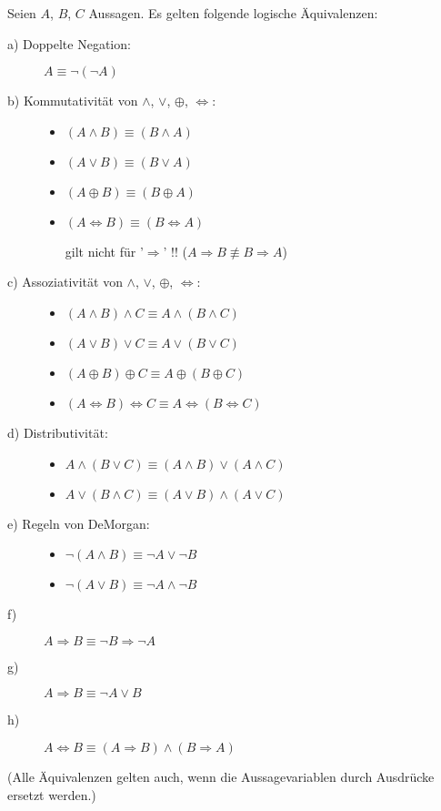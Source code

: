 \documentclass[a4paper, 12pt, twoside] {article}
\newcommand{\attention}{{\fontencoding{U}\fontfamily{futs}\selectfont\char 66\relax}\space}
\begin{document}
Seien $A$, $B$, $C$ Aussagen.
Es gelten folgende logische Äquivalenzen:
\begin{description}
  \item[a) Doppelte Negation:]
  $A \equiv \neg(\neg A)$

  \item[b) Kommutativität von $\wedge$, $\lor$, $\oplus$, $\Leftrightarrow$:] \hfill
  \begin{itemize}
    \item $(A \wedge B) \equiv (B \wedge A)$
    \item $(A \lor B) \equiv (B \lor A)$
    \item $(A \oplus B) \equiv (B \oplus A)$
    \item $(A \Leftrightarrow B) \equiv (B \Leftrightarrow A)$

    \attention gilt nicht für '$\Rightarrow$' !! ($A \Rightarrow B \not\equiv B \Rightarrow A$)
  \end{itemize}  

  \item[c) Assoziativität von $\wedge$, $\lor$, $\oplus$, $\Leftrightarrow$:] \hfill
  \begin{itemize}
      \item $(A \wedge B) \wedge C \equiv A \wedge (B \wedge C)$
      \item $(A \lor B) \lor C \equiv A \lor (B \lor C)$
      \item $(A \oplus B) \oplus C \equiv A \oplus (B \oplus C)$
      \item $(A \Leftrightarrow B) \Leftrightarrow C \equiv A \Leftrightarrow (B \Leftrightarrow C)$
  \end{itemize}

  \item[d) Distributivität:] \hfill
  \begin{itemize}
  \item $A \wedge (B \lor C) \equiv (A \wedge B) \lor (A \wedge C)$
  \item $A \lor (B \wedge C) \equiv (A \lor B) \wedge (A \lor C)$
  \end{itemize}

  \item[e) Regeln von DeMorgan:] \hfill
  \begin{itemize}
  \item $\neg (A \wedge B) \equiv \neg A \lor \neg B$
  \item $\neg (A \lor B) \equiv \neg A \wedge \neg B$
  \end{itemize}

  \item[f)]
  $A \Rightarrow B \equiv \neg B \Rightarrow \neg A$

  \item[g)]
  $A \Rightarrow B \equiv \neg A \lor B$

  \item[h)]
  $A \Leftrightarrow B \equiv (A \Rightarrow B) \wedge (B \Rightarrow A)$
\end{description}
  (Alle Äquivalenzen gelten auch, wenn die Aussagevariablen durch Ausdrücke ersetzt werden.)
\end{document}
